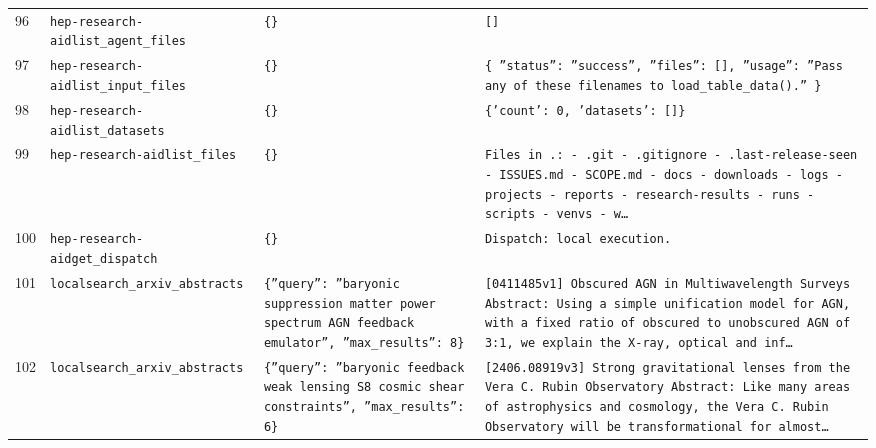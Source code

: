 \documentclass[11pt,a4paper]{article}
\begin{document}
\begin{longtable}{@{}p{}p{}p{}p{}@{}}
96 & \texttt{hep-research-aid}\newline\texttt{list\_\allowbreak{}agent\_\allowbreak{}files} & \texttt{\{\}\allowbreak{}} & \texttt{[]\allowbreak{}} \\
97 & \texttt{hep-research-aid}\newline\texttt{list\_\allowbreak{}input\_\allowbreak{}files} & \texttt{\{\}\allowbreak{}} & \texttt{\{   ''status'':\allowbreak{} ''success'',\allowbreak{}   ''files'':\allowbreak{} []\allowbreak{},\allowbreak{}   ''usage'':\allowbreak{} ''Pass any of these filenames to load\_\allowbreak{}table\_\allowbreak{}data()\allowbreak{}.'' \}\allowbreak{}} \\
98 & \texttt{hep-research-aid}\newline\texttt{list\_\allowbreak{}datasets} & \texttt{\{\}\allowbreak{}} & \texttt{\{'count':\allowbreak{} 0,\allowbreak{} 'datasets':\allowbreak{} []\allowbreak{}\}\allowbreak{}} \\
99 & \texttt{hep-research-aid}\newline\texttt{list\_\allowbreak{}files} & \texttt{\{\}\allowbreak{}} & \texttt{Files in .:\allowbreak{}   - .git   - .gitignore   - .last-release-seen   - ISSUES.md   - SCOPE.md   - docs   - downloads   - logs   - projects   - reports   - research-results   - runs   - scripts   - venvs   - w\ldots{}\allowbreak{}} \\
100 & \texttt{hep-research-aid}\newline\texttt{get\_\allowbreak{}dispatch} & \texttt{\{\}\allowbreak{}} & \texttt{Dispatch:\allowbreak{} local execution.} \\
101 & \texttt{local}\newline\texttt{search\_\allowbreak{}arxiv\_\allowbreak{}abstracts} & \texttt{\{''query'':\allowbreak{} ''baryonic suppression matter power spectrum AGN feedback emulator'',\allowbreak{} ''max\_\allowbreak{}results'':\allowbreak{} 8\}\allowbreak{}} & \texttt{[0411485v1]\allowbreak{} Obscured AGN in Multiwavelength Surveys Abstract:\allowbreak{}   Using a simple unification model for AGN,\allowbreak{} with a fixed ratio of obscured to unobscured AGN of 3:\allowbreak{}1,\allowbreak{} we explain the X-ray,\allowbreak{} optical and inf\ldots{}\allowbreak{}} \\
102 & \texttt{local}\newline\texttt{search\_\allowbreak{}arxiv\_\allowbreak{}abstracts} & \texttt{\{''query'':\allowbreak{} ''baryonic feedback weak lensing S8 cosmic shear constraints'',\allowbreak{} ''max\_\allowbreak{}results'':\allowbreak{} 6\}\allowbreak{}} & \texttt{[2406.08919v3]\allowbreak{} Strong gravitational lenses from the Vera C. Rubin Observatory Abstract:\allowbreak{} Like many areas of astrophysics and cosmology,\allowbreak{} the Vera C. Rubin Observatory will be transformational for almost\ldots{}\allowbreak{}} \\

\end{longtable}
\end{document}
